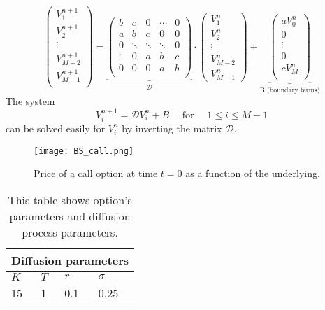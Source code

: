 $$
\left(
\begin{array}{c}
V^{n+1}_{1} \\
V^{n+1}_{2} \\
\vdots \\
V^{n+1}_{M-2} \\
V^{n+1}_{M-1} \\
\end{array}
\right) = 
\underbrace{
\left(
\begin{array}{ccccc}
b     & c  & 0 & \cdots  & 0 \\
a     & b  & c & 0  & 0  \\
0      & \ddots & \ddots &   \ddots     & 0  \\
\vdots & 0 & a & b  & c  \\
0      & 0 & 0 & a  & b \\
\end{array}
\right) }_{\mathcal{D}} \cdot
\left(
\begin{array}{c}
V^{n}_{1} \\
V^{n}_{2} \\
\vdots \\
V^{n}_{M-2} \\
V^{n}_{M-1} 
\end{array}
\right)
+ \underbrace{
\left(
\begin{array}{c}
 a V^{n}_{0} \\
  0 \\
 \vdots \\
 0 \\
c V^{n}_{M} \\
\end{array}
\right) }_{\mbox{B (boundary terms)}}
$$
The system 
$$ V^{n+1}_{i} = \mathcal{D} V^{n}_{i} + B \quad \mbox{ for } \quad 1 \leq i \leq M-1$$
can be solved easily for $V^{n}_{i}$ by inverting the matrix $\mathcal{D}$.
\begin{figure}[t]
   \centering
   \texttt{[image: BS\_call.png]}
   \caption{Price of a call option at time $t=0$ as a function of the underlying.}
   \label{BS_call}
\end{figure}  
\begin{table}[t]
\begin{center}
\begin{minipage}{0.8\linewidth}
\centering
 \begin{tabular}{||l|l|l|l||}
 \hline
  \multicolumn{4}{|c|}{Diffusion parameters} \\
  \hline
  $K$ & $T$ & $r$ & $\sigma$ \\
  \hline
  15 & 1 & 0.1 & 0.25 \\
  \hline
  \end{tabular}
  \caption{This table shows option's parameters and diffusion process parameters.}
  \label{tab:BS}
\end{minipage}
 \end{center}
\end{table}

